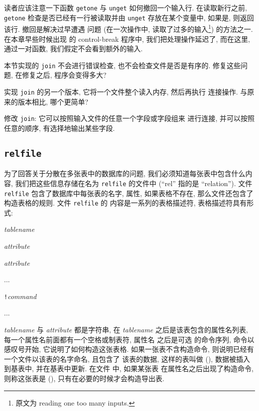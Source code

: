 读者应该注意一下函数 \texttt{getone} 与 \texttt{unget} 如何撤回一个输入行.
在读取新行之前, \texttt{getone} 检查是否已经有一行被读取并由
\texttt{unget} 存放在某个变量中, 如果是, 则返回该行. 撤回是解决过早遭遇
问题 (在一次操作中, 读取了过多的输入\footnote{原文为 reading one too
many inputs.}) 的方法之一.
在本章早些时候出现 的 control-break 程序中, 我们把处理操作延迟了, 而在这里,
通过一对函数, 我们假定不会看到额外的输入.

\begin{exercise}
    \label{exer:join}
    本节实现的 \texttt{join} 不会进行错误检查, 也不会检查文件是否是有序的.
    修复这些问题, 在修复之后, 程序会变得多大?
\end{exercise}

\begin{exercise}
    实现 \texttt{join} 的另一个版本, 它将一个文件整个读入内存, 然后再执行
    连接操作. 与原来的版本相比, 哪个更简单?
\end{exercise}

\begin{exercise}
    修改 \texttt{join}: 它可以按照输入文件的任意一个字段或字段组来
    进行连接, 并可以按照任意的顺序, 有选择地输出某些字段.
\end{exercise}

\subsection{\textbf{\texttt{relfile}}}
为了回答关于分散在多张表中的数据库的问题, 我们必须知道每张表中包含什么内容,
我们把这些信息存储在名为 \texttt{relfile} 的文件中 (``rel'' 指的是
``relation''). 文件 \texttt{relfile} 包含了数据库中每张表的名字, 属性,
如果表格不存在, 那么文件还包含了构造表格的规则. 文件 \texttt{relfile} 的
内容是一系列的表格描述符, 表格描述符具有形式:
\begin{pattern}
    \indent\textit{tablename} \par
    \indent\indent\textit{attribute} \par
    \indent\indent\textit{attribute} \par
    \indent\indent\indent ...   \par
    \indent\indent\texttt{!}\textit{command} \par
    \indent\indent\indent ...
\end{pattern}
\textit{tablename} 与 \textit{attribute} 都是字符串, 在 \textit{tablename}
之后是该表包含的属性名列表, 每一个属性名前面都有一个空格或制表符, 属性名
之后是可选 的命令序列, 命令以感叹号开始, 它说明了如何构造这张表格.
如果一张表不含构造命令, 则说明已经有一个文件以该表的名字命名, 且包含了
该表的数据, 这样的表叫做  (), 数据被插入
到基表中, 并在基表中更新. 在文件  中, 如果某张表
在属性名之后出现了构造命令, 则称这张表是  (), 只有在必要的时候才会构造导出表.


